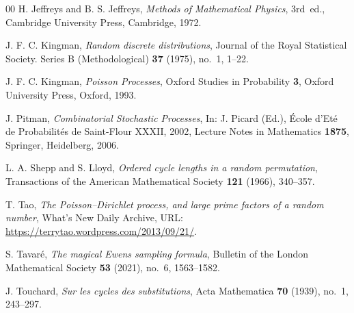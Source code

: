 \documentclass{amsart}
\theoremstyle{definition}
\theoremstyle{remark}
\numberwithin{equation}{section}
\begin{document}
\begin{thebibliography}{00}
H. Jeffreys and B. S. Jeffreys, 
\textit{Methods of Mathematical Physics}, 3rd~ed.,
Cambridge University Press, Cambridge, 1972.

J. F. C. Kingman, 
\textit{Random discrete distributions},
{Journal of the Royal Statistical Society. Series B (Methodological)} \textbf{37} (1975), no.~1, 1--22.

J. F. C. Kingman, 
\textit{Poisson Processes},
Oxford Studies in Probability \textbf{3}, 
Oxford University Press, Oxford, 1993.

J. Pitman, 
\textit{Combinatorial Stochastic Processes}, In: J. Picard (Ed.), \'{E}cole d'Et\'{e} de Probabilit\'{e}s de Saint-Flour XXXII, 2002, Lecture Notes in Mathematics \textbf{1875},
Springer, Heidelberg, 2006.

L. A. Shepp and S. Lloyd,
\textit{Ordered cycle lengths in a random permutation},
{Transactions of the American Mathematical Society} \textbf{121} (1966), 340--357.

T. Tao,
\textit{The Poisson--Dirichlet process, and large prime factors of a random number},
{What's New Daily Archive}, URL: \url{https://terrytao.wordpress.com/2013/09/21/}. 

S. Tavar{\'e}, 
\textit{The magical {E}wens sampling formula},
{Bulletin of the London Mathematical Society} \textbf{53} (2021), no.~6, 1563--1582.

J. Touchard, 
\textit{Sur les cycles des substitutions},
{Acta Mathematica} \textbf{70} (1939), no.~1, 243--297.

\end{thebibliography}
\end{document}
